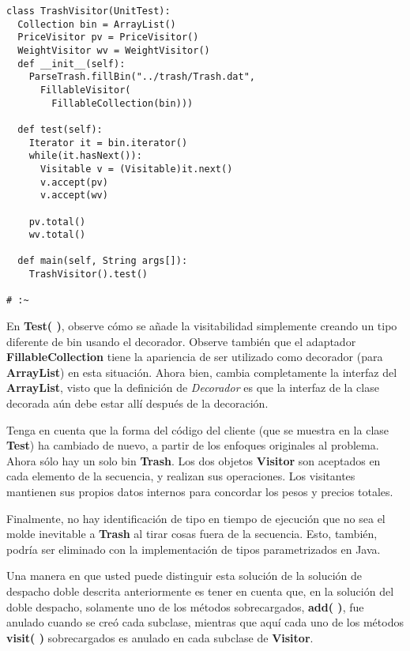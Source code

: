 \begin{lstlisting}
class TrashVisitor(UnitTest): 
  Collection bin = ArrayList() 
  PriceVisitor pv = PriceVisitor() 
  WeightVisitor wv = WeightVisitor() 
  def __init__(self): 
    ParseTrash.fillBin("../trash/Trash.dat",  
      FillableVisitor( 
        FillableCollection(bin))) 
        
  def test(self): 
    Iterator it = bin.iterator() 
    while(it.hasNext()): 
      Visitable v = (Visitable)it.next() 
      v.accept(pv) 
      v.accept(wv) 
      
    pv.total() 
    wv.total() 
    
  def main(self, String args[]): 
    TrashVisitor().test() 
    
# :~ 
\end{lstlisting}

En \textbf{Test( )}, observe cómo se añade la visitabilidad simplemente creando un tipo diferente de bin usando el decorador. Observe también que el adaptador \textbf{FillableCollection} tiene la apariencia de ser utilizado como decorador (para \textbf{ArrayList}) en esta situación.  Ahora bien, cambia completamente la interfaz del \textbf{ArrayList}, visto que la definición de \textit{Decorador} es que la interfaz de la clase decorada aún debe estar allí después de la decoración.      \newline

Tenga en cuenta que la forma del código del cliente (que se muestra en la clase \textbf{Test}) ha cambiado de nuevo, a partir de los enfoques originales al problema. Ahora sólo hay un solo bin \textbf{Trash}. Los dos objetos \textbf{Visitor} son aceptados en cada elemento de la secuencia, y realizan sus operaciones. Los visitantes mantienen sus propios datos internos para concordar los pesos y precios totales.        \newline

Finalmente, no hay identificación de tipo en tiempo de ejecución que no sea el molde inevitable a \textbf{Trash} al tirar cosas fuera de la secuencia. Esto, también, podría ser eliminado con la implementación de tipos parametrizados en Java.        \newline

Una manera en que usted puede distinguir esta solución de la solución de despacho doble descrita anteriormente es tener en cuenta que, en la solución del doble despacho, solamente uno de los métodos sobrecargados, \textbf{add( )},  fue anulado cuando se creó cada subclase, mientras que aquí cada uno de los métodos \textbf{visit( )} sobrecargados es anulado en cada subclase de \textbf{Visitor}.          \newline

